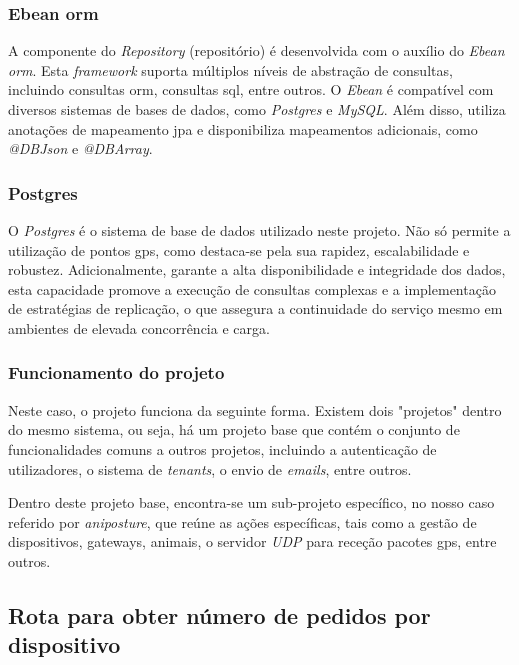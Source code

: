 \subsubsection{\textbf{Ebean \acs{orm}}}
A componente do \textit{Repository} (repositório) é desenvolvida com o auxílio do \textit{Ebean \acs{orm}}. Esta \textit{framework} suporta múltiplos níveis de abstração de consultas, incluindo consultas \acs{orm}, consultas \acs{sql}, entre outros. O \textit{Ebean} é compatível com diversos sistemas de bases de dados, como \textit{Postgres} e \textit{MySQL}. Além disso, utiliza anotações de mapeamento \acs{jpa} e disponibiliza mapeamentos adicionais, como \textit{@DBJson} e \textit{@DBArray}.

\subsubsection{\textbf{Postgres}}
O \textit{Postgres} é o sistema de base de dados utilizado neste projeto. Não só permite a utilização de pontos \acs{gps}, como destaca-se pela sua rapidez, escalabilidade e robustez. Adicionalmente, garante a alta disponibilidade e integridade dos dados, esta capacidade promove a execução de consultas complexas e a implementação de estratégias de replicação, o que assegura a continuidade do serviço mesmo em ambientes de elevada concorrência e carga.

\subsubsection{\textbf{Funcionamento do projeto}}
Neste caso, o projeto funciona da seguinte forma. Existem dois "projetos" dentro do mesmo sistema, ou seja, há um projeto base que contém o conjunto de funcionalidades comuns a outros projetos, incluindo a autenticação de utilizadores, o sistema de \textit{tenants}, o envio de \textit{emails}, entre outros.

Dentro deste projeto base, encontra-se um sub-projeto específico, no nosso caso referido por \textit{aniposture}, que reúne as ações específicas, tais como a gestão de dispositivos, gateways, animais, o servidor \textit{UDP} para receção pacotes \acs{gps}, entre outros.

\clearpage
\subsection{Rota para obter número de pedidos por dispositivo} %

